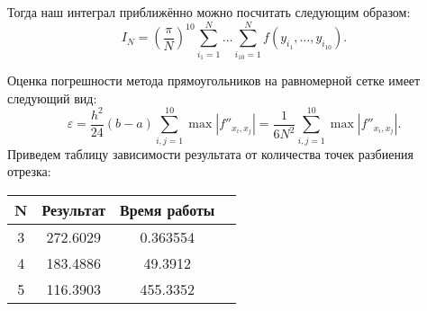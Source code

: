 Тогда наш интеграл приближённо можно посчитать следующим образом:
\[
I_N = \left( \dfrac{\pi}{N} \right)^{10} \sum\limits_{i_1 = 1}^N \ldots
 \sum\limits_{i_{10} = 1}^N f(y_{i_1}, \ldots, y_{i_{10}}).
\]


Оценка погрешности метода прямоугольников на равномерной сетке имеет следующий
 вид: 
$$
\varepsilon = \dfrac{h^2}{24} (b - a) \sum\limits_{i,j = 1}^{10} \max \left|
 f''_{x_i, x_j} \right| = \dfrac{1}{6N^2} \sum\limits_{i,j = 1}^{10} \max 
 \left|f''_{x_i,x_j} \right|.
$$
Приведем таблицу зависимости результата от количества точек разбиения отрезка:
\begin{center}
	\begin{tabular}{|c|c|c|c|}
		\hline
		N & Результат & Время работы\\\hline
		3&272.6029&0.363554\\\hline
		4&183.4886&49.3912\\\hline
		5&116.3903&455.3352\\\hline
	\end{tabular}
\end{center}